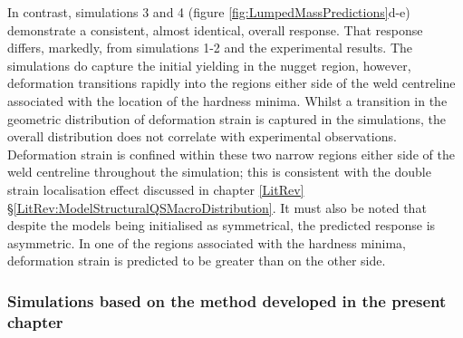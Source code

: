 In contrast, simulations 3 and 4 (figure \ref{fig:LumpedMassPredictions}d-e) demonstrate a consistent, almost identical, overall response. That response differs, markedly, from simulations 1-2 and the experimental results. The simulations do capture the initial yielding in the nugget region, however, deformation transitions rapidly into the regions either side of the weld centreline associated with the location of the hardness minima. Whilst a transition in the geometric distribution of deformation strain is captured in the simulations, the overall distribution does not correlate with experimental observations. Deformation strain is confined within these two narrow regions either side of the weld centreline throughout the simulation; this is consistent with the double strain localisation effect discussed in chapter \ref{LitRev} \S\ref{LitRev:ModelStructuralQSMacroDistribution}. It must also be noted that despite the models being initialised as symmetrical, the predicted response is asymmetric. In one of the regions associated with the hardness minima, deformation strain is predicted to be greater than on the other side. 


\subsubsection{Simulations based on the method developed in the present chapter}
\label{SMDModellingstudyResultsSims1to4Correction2}

